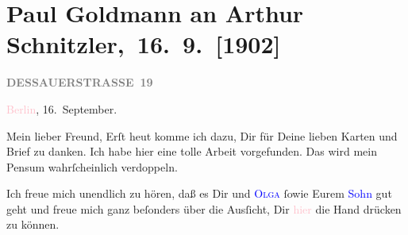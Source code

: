 

\renewcommand{\erwaehntePersonen}{Personen: Olga Schnitzler, Heinrich Schnitzler}
\renewcommand{\erwaehnteOrte}{Orte: Berlin, Dessauer Straße, Wien}
\renewcommand{\erwaehnteWerke}{Werke: Die Zeit, Die Zeit. Wiener Wochenschrift}
\section[ Paul Goldmann an Arthur Schnitzler, 16. 9. {[}1902{]}]{Paul Goldmann an Arthur Schnitzler, 16. 9. {[}1902{]}}
\nopagebreak{}
\rehead{ }\normalsize\beginnumbering{}
\toendnotes[C]{\smallbreak\pagebreak[2]}
\toendnotes[C]{\smallbreak}
\pstart
           \noindent{}\raggedleft{}{\pb}\textcolor{pink}{\textcolor{gray}{\textbf{DESSAUERSTRASSE 19}}}{}\ledrightnote{\textcolor{pink}{Dessauer Straße}}\pend
           
\pstart
           \textcolor{pink}{Berlin}{}\ledrightnote{\textcolor{pink}{Berlin}}, 16. September.\pend
           
\pstart\center{}Mein lieber Freund,\pend
\pstart
           Erſt heut komme ich dazu, Dir für Deine lieben Karten
               und Brief zu danken. Ich habe hier eine tolle Arbeit vorgefunden. Das \label{K_L03224-1v}\label{K_L03224-1h} wird mein Pensum  wahrſcheinlich
               verdoppeln.\pend
           
\pstart
           Ich freue mich unendlich {\pb}zu hören, daß es Dir und
                  \textsc{\textcolor{blue}{Olga}{}\ledrightnote{\textcolor{blue}{Olga Schnitzler}}} ſowie Eurem \textcolor{blue}{Sohn}{}\ledrightnote{{$\rightarrow$}\textcolor{blue}{Heinrich Schnitzler}} gut
               geht und freue mich ganz beſonders über die Ausſicht, Dir \label{K_L03224-2v}\label{K_L03224-2h}{ }\textcolor{pink}{hier}{}\ledrightnote{{$\rightarrow$}\textcolor{pink}{Berlin}} die Hand drücken zu
               können.\pend
           
